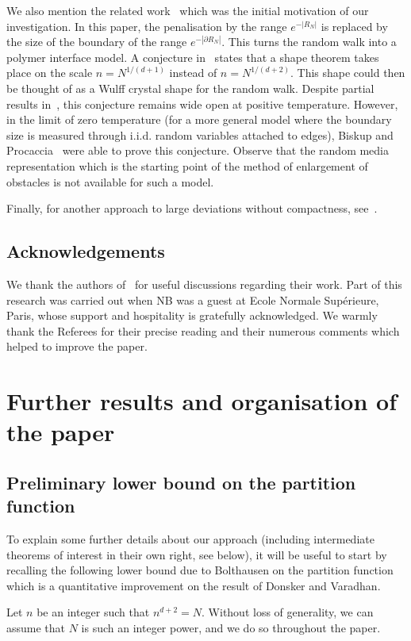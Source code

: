 \documentclass[10pt]{amsart}
\theoremstyle{definition}\newtheorem{defi}[theo]{Definition}\newtheorem{rema}[theo]{Remark}\newtheorem{exam}[theo]{Example}\newtheorem{exem}[theo]{Example}\newtheorem{nota}[theo]{Notation}
\begin{document}
We also mention the related work~\cite{BY} which was the initial motivation of our investigation. In this paper, the penalisation by the range $e^{ - |R_N|}$ is replaced by the size of the boundary of the range $e^{ - | \partial R_N|}$. This turns the random walk into a polymer interface model. A conjecture in~\cite{BY} states that a shape theorem takes place on the scale $n = N^{ 1/ (d+1)}$ instead of $n = N^{ 1/ (d+2)}$. This shape could then be thought of as a Wulff crystal shape for the random walk. Despite partial results in~\cite{BY}, this conjecture remains wide open at positive temperature. However, in the limit of zero temperature (for a more general model where the boundary size is measured through i.i.d. random variables attached to edges), Biskup and Procaccia~\cite{BP1, BP2} were able to prove this conjecture. Observe that the random media representation which is the starting point of the method of enlargement of obstacles is not available for such a model.


Finally, for another approach to large deviations without compactness, see~\cite{MV}.

\subsection*{Acknowledgements}
We thank the authors of~\cite{DFSX} for useful discussions regarding their work. Part of this research was carried out when NB was a guest at Ecole Normale Supérieure, Paris, whose support and hospitality is gratefully acknowledged.
We warmly thank the Referees for their precise reading and their numerous comments which helped to improve the paper.
\section{Further results and organisation of the paper}

\subsection{Preliminary lower bound on the partition function}

To explain some further details about our approach (including intermediate theorems of interest in their own right, see below), it will be useful to start by recalling the following lower bound due to Bolthausen on the partition function which is a quantitative improvement on the result of Donsker and Varadhan.

Let $n$ be an integer such that $n^{d+2}=N$. Without loss of generality, we can assume that $N$ is such an integer power, and we do so throughout the paper.
\end{document}
